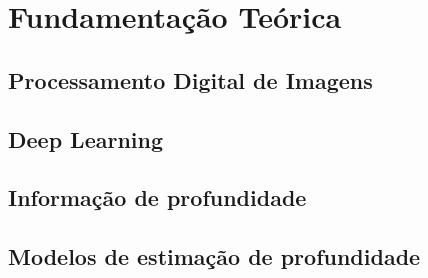 


\chapter{Fundamentação Teórica}

\section{Processamento Digital de Imagens}

\section{Deep Learning}

\section{Informação de profundidade}

\section{Modelos de estimação de profundidade}
